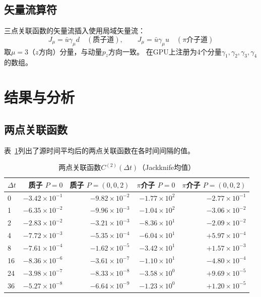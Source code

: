 \documentclass[11pt,a4paper]{article}
\begin{document}
\subsection{矢量流算符}

三点关联函数的矢量流插入使用局域矢量流：
\begin{equation}
J_\mu = \bar{u}\gamma_\mu d \quad (\text{质子道}),\qquad
J_\mu = \bar{u}\gamma_\mu u \quad (\pi\text{介子道})
\end{equation}
取$\mu=3$（$z$方向）分量，与动量$p_z$方向一致。
在GPU上注册为4个分量$\gamma_1,\gamma_2,\gamma_3,\gamma_4$的数组。

\section{结果与分析}

\subsection{两点关联函数}

表~\ref{tab:corr}列出了源时间平均后的两点关联函数在各时间间隔的值。

\begin{table}[htbp]
\centering
\caption{两点关联函数$C^{(2)}(\Delta t)$（Jackknife均值）}
\label{tab:corr}
\begin{tabular}{lrrrr}
\toprule
$\Delta t$ & 质子 $P=0$ & 质子 $P=(0,0,2)$ & $\pi$介子 $P=0$ & $\pi$介子 $P=(0,0,2)$ \\
\midrule
0  & $-3.42\times 10^{-1}$ & $-9.82\times 10^{-2}$ & $-1.77\times 10^{2}$ & $-2.77\times 10^{-1}$ \\
1  & $-6.35\times 10^{-2}$ & $-9.96\times 10^{-3}$ & $-1.04\times 10^{2}$ & $-3.06\times 10^{-2}$ \\
2  & $-2.83\times 10^{-2}$ & $-3.21\times 10^{-3}$ & $-8.36\times 10^{1}$ & $-2.09\times 10^{-2}$ \\
4  & $-7.72\times 10^{-3}$ & $-5.35\times 10^{-4}$ & $-6.04\times 10^{1}$ & $+5.97\times 10^{-4}$ \\
8  & $-7.61\times 10^{-4}$ & $-1.62\times 10^{-5}$ & $-3.42\times 10^{1}$ & $+1.57\times 10^{-3}$ \\
16 & $-8.36\times 10^{-6}$ & $-3.61\times 10^{-7}$ & $-1.10\times 10^{1}$ & $-4.80\times 10^{-4}$ \\
24 & $-3.98\times 10^{-7}$ & $-8.33\times 10^{-8}$ & $-3.58\times 10^{0}$ & $+9.69\times 10^{-5}$ \\
36 & $-5.27\times 10^{-8}$ & $-6.64\times 10^{-9}$ & $-1.23\times 10^{0}$ & $+1.20\times 10^{-5}$ \\
\bottomrule
\end{tabular}
\end{table}
\end{document}
